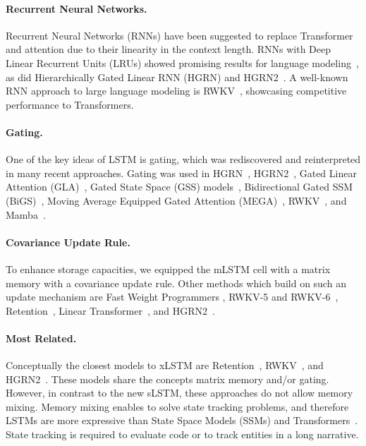 \paragraph{Recurrent Neural Networks.} Recurrent Neural Networks (RNNs) have been suggested to replace Transformer and attention due to their linearity in the context length. RNNs with Deep Linear Recurrent Units (LRUs) showed promising results for language modeling~\citep{Orvieto:23, De:24arxiv}, as did Hierarchically Gated Linear RNN (HGRN) \citep{Qin:23} and HGRN2~\citep{Qin:24arxiv}. A well-known RNN approach to large language modeling is RWKV~\citep{Peng:23arxivshort,Peng:24arxivshort}, showcasing competitive performance to Transformers.

\paragraph{Gating.}
One of the key ideas of LSTM is gating, which was rediscovered and reinterpreted in many recent approaches. Gating was used in HGRN~\citep{Qin:23}, HGRN2~\citep{Qin:24arxiv}, Gated Linear Attention (GLA)~\citep{Yang:23arxiv}, Gated State Space (GSS) models~\citep{Mehta:22}, Bidirectional Gated SSM (BiGS)~\citep{Wang:22}, Moving Average Equipped Gated Attention (MEGA)~\citep{Ma:22}, RWKV~\citep{Peng:23arxivshort}, and Mamba~\citep{Gu:24arxiv}.

\paragraph{Covariance Update Rule.} To enhance storage capacities, we equipped the mLSTM cell with a matrix memory with a covariance update rule. Other methods which build on such an update mechanism are Fast Weight Programmers \citep{Schmidhuber:92ncfastweights,Schlag:21}, RWKV-5 and RWKV-6~\citep{Peng:24arxivshort}, Retention~\citep{Sun:23arxiv}, Linear Transformer~\citep{Katharopoulos:20}, and HGRN2~\citep{Qin:24arxiv}.

\paragraph{Most Related.} Conceptually the closest models to xLSTM are Retention~\citep{Sun:23arxiv}, RWKV~\citep{Peng:23arxivshort,Peng:24arxivshort}, and HGRN2~\citep{Qin:24arxiv}. These models share the concepts matrix memory and/or gating. However, in contrast to the new sLSTM, these approaches do not allow memory mixing. Memory mixing enables to solve state tracking problems, and therefore LSTMs are more expressive than State Space Models (SSMs) and Transformers~\citep{Merrill:24,Deletang:23}. State tracking is required to evaluate code or to track entities in a long narrative.

